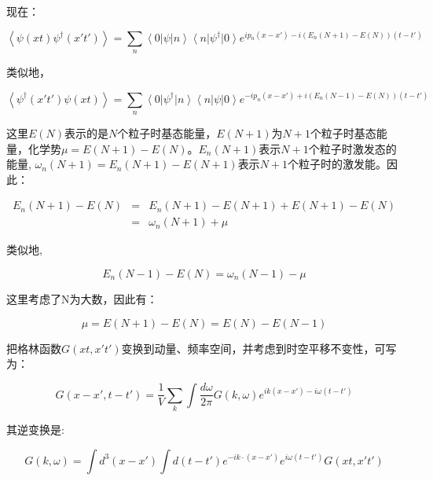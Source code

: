 现在：

\begin{equation}
\left\langle \psi(xt) \psi^\dagger (x't')  \right\rangle = \sum\limits_n \left\langle 0 \right| \psi \left| n \right\rangle \left\langle n \right| \psi^\dagger \left| 0 \right\rangle e^{i p_n (x-x')  - i (E_n (N+1) -E(N) ) (t-t')} 
\end{equation}

类似地，

\begin{equation}
\left\langle \psi^\dagger (x't') \psi (xt)  \right\rangle = \sum\limits_n \left\langle 0 \right| \psi^\dagger \left| n \right\rangle \left\langle n \right| \psi \left| 0 \right\rangle e^{-i p_n (x- x') + i (E_n (N-1) - E(N) ) (t-t')} 
\end{equation}

这里$E(N)$表示的是$N$个粒子时基态能量，$E(N+1)$为$N+1$个粒子时基态能量，化学势$\mu
= E(N+1) - E(N)$。$E_n(N+1)$表示$N+1$个粒子时激发态的能量, $\omega_n
(N+1) = E_n(N+1)-E(N+1)$表示$N+1$个粒子时的激发能。因此：

\begin{eqnarray*}
E_n (N + 1) - E(N) &=& E_n (N + 1) - E(N + 1) + E(N + 1) - E(N) \\
{} &=& \omega _n (N + 1) + \mu
\end{eqnarray*}

类似地,

\begin{equation*}
E_n (N - 1) - E(N) = \omega _n (N - 1) - \mu
\end{equation*}


这里考虑了N为大数，因此有：

\begin{equation*}
\mu  = E(N + 1) - E(N) = E(N) - E(N - 1)
\end{equation*}

把格林函数$G(xt,x't')$变换到动量、频率空间，并考虑到时空平移不变性，可写为：

\begin{equation}\label{FT of 1D GF}
G\left( {x - x',t - t'} \right) = \frac{1} {V}\sum\limits_k {\int
{\frac{{d\omega }} {{2\pi }}} } G\left( {k,\omega } \right)e^{ik(x -
x') - i\omega (t - t')}
\end{equation}

其逆变换是:

\begin{equation*}
G(k,\omega)=\int d^3(x-x')\int d(t-t') e^{-ik \cdot (x-x')} e^{i
\omega (t-t')} G(xt,x't')
\end{equation*}


